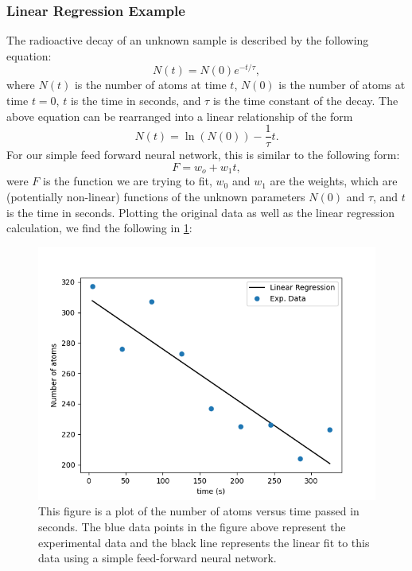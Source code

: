 \subsubsection{Linear Regression Example}
The radioactive decay of an unknown sample is described by the following equation:
\begin{equation}
N(t) = N(0) e^{-t/\tau},
\end{equation}
where $N(t)$ is the number of atoms at time $t$, $N(0)$ is the number of atoms at time $t=0$, $t$ is the time in seconds, and $\tau$ is the time constant of the decay. The above equation can be rearranged into a linear relationship of the form 
\begin{equation}
N(t) = \ln{\left( N(0) \right)} - \frac{1}{\tau}t.
\end{equation}
For our simple feed forward neural network, this is similar to the following form:
\begin{equation}
F = w_o + w_1t,
\end{equation}
were $F$ is the function we are trying to fit, $w_0$ and $w_1$ are the weights, which are (potentially non-linear) functions of the unknown parameters $N(0)$ and $\tau$, and $t$ is the time in seconds. Plotting the original data as well as the linear regression calculation, we find the following in \cref*{fig:decay}:
\begin{figure}[H]
\centering
\includegraphics[scale=0.75]{../figures/decay_data.png}
\caption{This figure is a plot of the number of atoms versus time passed in seconds. The blue data points in the figure above represent the experimental data and the black line represents the linear fit to this data using a simple feed-forward neural network.}
\label{fig:decay}
\end{figure}